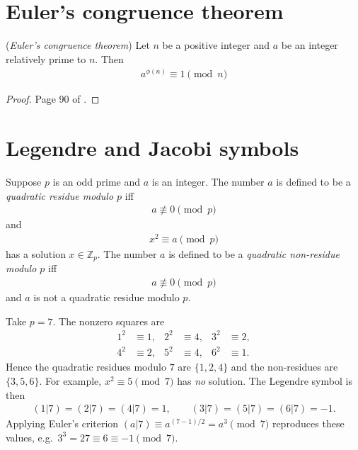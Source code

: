 \documentclass[a4paper, 12pt]{book} %
\begin{document}
\section{Euler's congruence theorem}

\begin{theorem}
    (\emph{Euler's congruence theorem}) Let $n$ be a positive integer and $a$ be an integer relatively prime to $n$. Then
    \begin{align}
        a^{\phi(n)} \equiv 1 \pmod{n}
    \end{align}
\end{theorem}
\begin{proof}
    Page 90 of \cite{rubinstein2018cryptography}.
\end{proof}


\section{Legendre and Jacobi symbols}
Suppose $p$ is an odd prime and $a$ is an integer. The number $a$ is defined to be a \emph{quadratic residue modulo $p$} iff 
\begin{align}
    a \not\equiv 0 \pmod{p}
\end{align}
and 
\begin{align}
    x^2 \equiv a \pmod{p}
\end{align}
    has a solution $x \in \mathbb{Z}_p$. The number $a$ is defined to be a \emph{quadratic non-residue modulo $p$} iff
\begin{align}
    a \not\equiv 0 \pmod{p}
\end{align}
and $a$ is not a quadratic residue modulo $p$.

\begin{example}
    Take $p = 7$. The nonzero squares are
    \begin{align}
        1^2 &\equiv 1, & 2^2 &\equiv 4, & 3^2 &\equiv 2, \\
        4^2 &\equiv 2, & 5^2 &\equiv 4, & 6^2 &\equiv 1.
    \end{align}
    Hence the quadratic residues modulo $7$ are $\{1, 2, 4\}$ and the non-residues are $\{3, 5, 6\}$. For example, $x^2 \equiv 5 \pmod 7$ has \emph{no} solution. The Legendre symbol is then
    \begin{align}
        (1|7) = (2|7) = (4|7) = 1, \qquad (3|7) = (5|7) = (6|7) = -1.
    \end{align}
    Applying Euler's criterion $(a|7) \equiv a^{(7-1)/2} = a^3 \pmod 7$ reproduces these values, e.g.\ $3^3 = 27 \equiv 6 \equiv -1 \pmod 7$.
\end{example}
\end{document}
